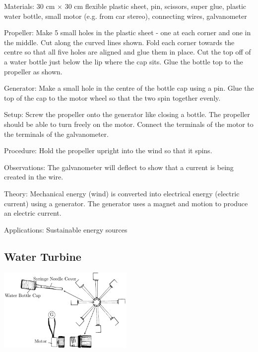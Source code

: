 \begin{multicols}{2}
\begin{description*}
\item[Materials:]{30 cm $\times$ 30 cm flexible plastic sheet, pin, scissors, super glue, plastic water bottle, small motor (e.g. from car stereo), connecting wires, galvanometer}
\item[Propeller:]{Make 5 small holes in the plastic sheet - one at each corner and one in the middle. Cut along the curved lines shown. Fold each corner towards the centre so that all five holes are aligned and glue them in place. Cut the top off of a water bottle just below the lip where the cap sits. Glue the bottle top to the propeller as shown. }
\item[Generator:]{Make a small hole in the centre of the bottle cap using a pin. Glue the top of the cap to the motor wheel so that the two spin together evenly.}
\item[Setup:]{Screw the propeller onto the generator like closing a bottle. The propeller should be able to turn freely on the motor. Connect the terminals of the motor to the terminals of the galvanometer.}
\item[Procedure:]{Hold the propeller upright into the wind so that it spins.}
\item[Observations:]{The galvanometer will deflect to show that a current is being created in the wire.}
\item[Theory:]{Mechanical energy (wind) is converted into electrical energy (electric current) using a generator. The generator uses a magnet and motion to produce an electric current.}
\item[Applications:]{Sustainable energy sources}
\end{description*}

\columnbreak

\subsection{Water Turbine} 
\label{sub:water-turbine}

\begin{center}
\includegraphics[width=0.49\textwidth]{./img/water-turbine.png}
\end{center}


\end{multicols}
